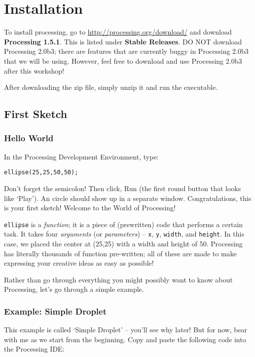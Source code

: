 
\section{Installation}
To install processing, go to \url{http://processing.org/download/} and download \textbf{Processing 1.5.1}.  This is listed under \textbf{Stable Releases}.  DO NOT download Processing 2.0b3; there are features that are currently buggy in Processing 2.0b3 that we will be using.  However, feel free to download and use Processing 2.0b3 after this workshop!

After downloading the zip file, simply unzip it and run the executable.

\subsection{First Sketch}
\subsubsection{Hello World}
In the Processing Development Environment, type:

\begin{verbatim}
ellipse(25,25,50,50);
\end{verbatim}

Don't forget the semicolon!  Then click, Run (the first round button that looks like `Play').  An circle should show up in a separate window.  Congratulations, this is your first sketch!  Welcome to the World of Processing!

\texttt{ellipse} is a \emph{function}; it is a piece of (prewritten) code that performs a certain task.  It takes four \emph{arguments} (or \emph{parameters}) -- \texttt{x}, \texttt{y}, \texttt{width}, and \texttt{height}.  In this case, we placed the center at (25,25) with a width and height of 50.  Processing has literally thousands of function pre-written; all of these are made to make expressing your creative ideas as easy as possible!

Rather than go through everything you might possibly want to know about Processing, let's go through a simple example.

\subsubsection{Example: Simple Droplet}
This example is called `Simple Droplet' -- you'll see why later!  But for now, bear with me as we start from the beginning.  Copy and paste the following code into the Processing IDE:

